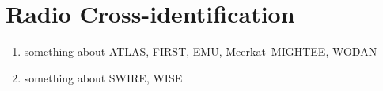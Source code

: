 \chapter{Radio Cross-identification}

\begin{enumerate}
    \item something about ATLAS, FIRST, EMU, Meerkat--MIGHTEE, WODAN
    \item something about SWIRE, WISE
\end{enumerate}
